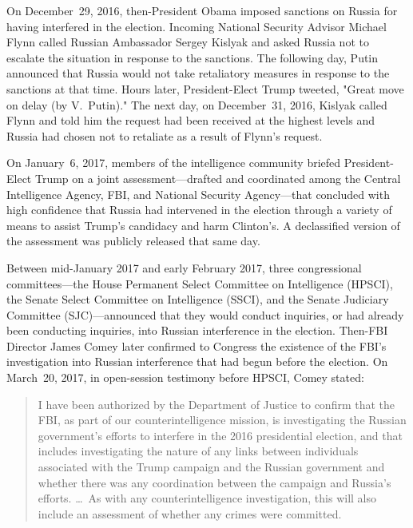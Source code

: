 On December~29, 2016, then-President Obama imposed sanctions on Russia for having interfered in the election.
Incoming National Security Advisor Michael Flynn called Russian Ambassador Sergey Kislyak and asked Russia not to escalate the situation in response to the sanctions.
The following day, Putin announced that Russia would not take retaliatory measures in response to the sanctions at that time.
Hours later, President-Elect Trump tweeted, "Great move on delay (by V.~Putin)."
The next day, on December~31, 2016, Kislyak called Flynn and told him the request had been received at the highest levels and Russia had chosen not to retaliate as a result of Flynn's request.

\hr

On January~6, 2017, members of the intelligence community briefed President-Elect Trump on a joint assessment---drafted and coordinated among the Central Intelligence Agency, FBI, and National Security Agency---that concluded with high confidence that Russia had intervened in the election through a variety of means to assist Trump's candidacy and harm Clinton's.
A declassified version of the assessment was publicly released that same day.

Between mid-January 2017 and early February 2017, three congressional committees---the House Permanent Select Committee on Intelligence (HPSCI), the Senate Select Committee on Intelligence (SSCI), and the Senate Judiciary Committee (SJC)---announced that they would conduct inquiries, or had already been conducting inquiries, into Russian interference in the election.
Then-FBI Director James Comey later confirmed to Congress the existence of the FBI's investigation into Russian interference that had begun before the election.
On March~20, 2017, in open-session testimony before HPSCI, Comey stated:

\begin{quote}
I have been authorized by the Department of Justice to confirm that the FBI, as part of our counterintelligence mission, is investigating the Russian government's efforts to interfere in the 2016 presidential election, and that includes investigating the nature of any links between individuals associated with the Trump campaign and the Russian government and whether there was any coordination between the campaign and Russia's efforts.
\dots\ 
As with any counterintelligence investigation, this will also include an assessment of whether any crimes were committed.
\end{quote}

